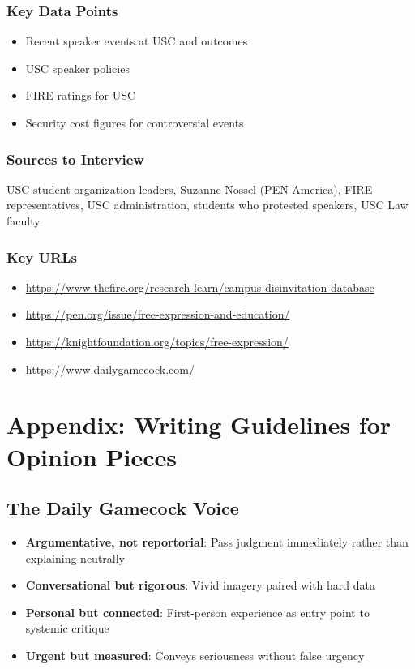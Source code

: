 \documentclass[11pt,letterpaper]{article}
\begin{document}
\subsubsection*{Key Data Points}
\begin{itemize}[noitemsep]
    \item Recent speaker events at USC and outcomes
    \item USC speaker policies
    \item FIRE ratings for USC
    \item Security cost figures for controversial events
\end{itemize}

\subsubsection*{Sources to Interview}
USC student organization leaders, Suzanne Nossel (PEN America), FIRE representatives, USC administration, students who protested speakers, USC Law faculty

\subsubsection*{Key URLs}
\begin{itemize}[noitemsep]
    \item \url{https://www.thefire.org/research-learn/campus-disinvitation-database}
    \item \url{https://pen.org/issue/free-expression-and-education/}
    \item \url{https://knightfoundation.org/topics/free-expression/}
    \item \url{https://www.dailygamecock.com/}
\end{itemize}

\newpage
\section*{Appendix: Writing Guidelines for Opinion Pieces}

\subsection*{The Daily Gamecock Voice}
\begin{itemize}[noitemsep]
    \item \textbf{Argumentative, not reportorial}: Pass judgment immediately rather than explaining neutrally
    \item \textbf{Conversational but rigorous}: Vivid imagery paired with hard data
    \item \textbf{Personal but connected}: First-person experience as entry point to systemic critique
    \item \textbf{Urgent but measured}: Conveys seriousness without false urgency
\end{itemize}
\end{document}
